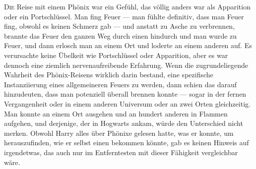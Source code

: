 
\lettrine{D}{ie} Reise mit einem Phönix war ein Gefühl, das völlig anders war als Apparition oder ein Portschlüssel. Man fing Feuer — man fühlte definitiv, dass man Feuer fing, obwohl es keinen Schmerz gab — und anstatt zu Asche zu verbrennen, brannte das Feuer den ganzen Weg durch einen hindurch und man wurde zu Feuer, und dann erlosch man an einem Ort und loderte an einem anderen auf. Es verursachte keine Übelkeit wie Portschlüssel oder Apparition, aber es war dennoch eine ziemlich nervenaufreibende Erfahrung. Wenn die zugrundeliegende Wahrheit des Phönix-Reisens wirklich darin bestand, eine spezifische Instanziierung eines allgemeineren Feuers zu werden, dann schien das darauf hinzudeuten, dass man potenziell überall brennen konnte — sogar in der fernen Vergangenheit oder in einem anderen Universum oder an zwei Orten gleichzeitig. Man konnte an einem Ort ausgehen und an hundert anderen in Flammen aufgehen, und derjenige, der in Hogwarts ankam, würde den Unterschied nicht merken. Obwohl Harry alles über Phönixe gelesen hatte, was er konnte, um herauszufinden, wie er selbst einen bekommen könnte, gab es keinen Hinweis auf irgendetwas, das auch nur im Entferntesten mit dieser Fähigkeit vergleichbar wäre.

